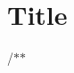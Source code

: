 \chapter{Title}
\hypertarget{md__dark_01_engine_2_source_2_title}{}\label{md__dark_01_engine_2_source_2_title}
/\texorpdfstring{$\ast$}{*}\texorpdfstring{$\ast$}{*} 